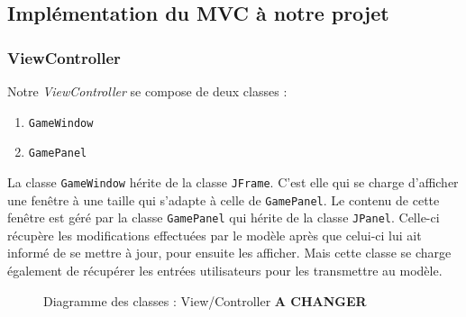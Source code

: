 	\subsection{Implémentation du MVC à notre projet}
		\subsubsection{ViewController}
		Notre \textit{ViewController} se compose de deux classes : 
		\begin{multicols}{2}
        \begin{enumerate}
            \item \texttt{GameWindow}
            \item \texttt{GamePanel}
        \end{enumerate}
	    \end{multicols}
	    La classe \texttt{GameWindow} hérite de la classe \texttt{JFrame}. C'est elle 
	    qui se charge d'afficher une fenêtre à une taille qui s'adapte à celle de \texttt{GamePanel}. Le contenu
	    de cette fenêtre est géré par la classe \texttt{GamePanel} qui hérite de la 
	    classe \texttt{JPanel}. Celle-ci récupère les modifications effectuées par le 
	    modèle après que celui-ci lui ait informé de se mettre à jour, pour ensuite 
	    les afficher. Mais cette classe se charge également de récupérer les entrées 
	    utilisateurs pour les transmettre
	    au modèle.
	    
		
		\begin{figure}[H]
        \centering
        \quad
            \caption {Diagramme des classes : View/Controller \textbf{A CHANGER}}
        \end{figure}		
            
